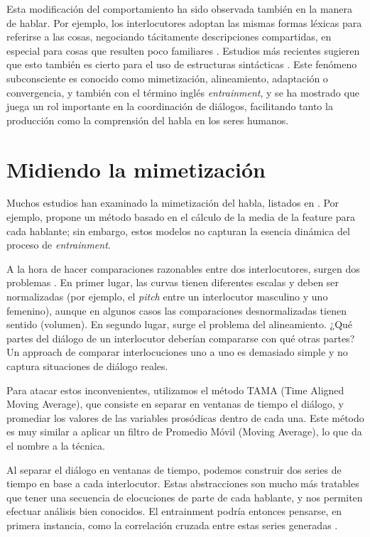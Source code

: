 Esta modificación del comportamiento ha sido observada también en la manera de hablar. Por ejemplo, los interlocutores adoptan las mismas formas léxicas para referirse a las cosas, negociando tácitamente descripciones compartidas, en especial para cosas que resulten poco familiares \cite{BRE1996}. Estudios más recientes sugieren que esto también es cierto para el uso de estructuras sintácticas \cite{REI2006}. Este fenómeno subconsciente es conocido como mimetización, alineamiento, adaptación o convergencia, y también con el término inglés \emph{entrainment}, y se ha mostrado que juega un rol importante en la coordinación de diálogos, facilitando tanto la producción como la comprensión del habla en los seres humanos.

\section*{Midiendo la mimetización}

Muchos estudios han examinado la mimetización del habla, listados en \cite{DEL2013}. Por ejemplo, \cite{LEV2012} propone un método basado en el cálculo de la media de la feature para cada hablante; sin embargo, estos modelos no capturan la esencia dinámica del proceso de \emph{entrainment}.

A la hora de hacer comparaciones razonables entre dos interlocutores, surgen dos problemas \cite{KOU2008}. En primer lugar, las curvas tienen diferentes escalas y deben ser normalizadas (por ejemplo, el \emph{pitch} entre un interlocutor masculino y uno femenino), aunque en algunos casos
las comparaciones desnormalizadas tienen sentido (volumen). En segundo lugar, surge el problema del alineamiento. ¿Qué partes del diálogo de un interlocutor deberían compararse con qué otras partes? Un approach de comparar interlocuciones uno a uno es demasiado simple y no captura situaciones de diálogo reales.

Para atacar estos inconvenientes, utilizamos el método TAMA (Time Aligned Moving Average), que consiste en separar en ventanas de tiempo el diálogo, y promediar los valores de las variables prosódicas dentro de cada una. Este método es muy similar a aplicar un filtro de Promedio Móvil (Moving Average), lo que da el nombre a la técnica.

Al separar el diálogo en ventanas de tiempo, podemos construir dos series de tiempo en base a cada interlocutor. Estas abstracciones son mucho más tratables que tener una secuencia de elocuciones de parte de cada hablante, y nos permiten efectuar análisis bien conocidos. El entrainment podría entonces pensarse, en primera instancia, como la correlación cruzada entre estas series generadas \cite{CHATFIELD}.
